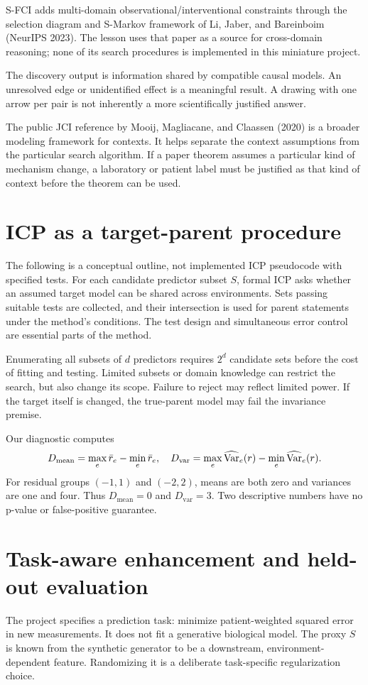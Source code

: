 \documentclass[11pt,oneside]{scrbook}
\begin{document}
S-FCI adds multi-domain observational/interventional constraints through the selection
diagram and S-Markov framework of Li, Jaber, and Bareinboim (NeurIPS 2023). The lesson
uses that paper as a source for cross-domain reasoning; none of its search procedures
is implemented in this miniature project.

\begin{keyidea}
The discovery output is information shared by compatible causal models. An unresolved
edge or unidentified effect is a meaningful result. A drawing with one arrow per pair
is not inherently a more scientifically justified answer.
\end{keyidea}

The public JCI reference by Mooij, Magliacane, and Claassen (2020) is a broader
modeling framework for contexts. It helps separate the context assumptions from
the particular search algorithm. If a paper theorem assumes a particular kind
of mechanism change, a laboratory or patient label must be justified as that kind
of context before the theorem can be used.

\section{ICP as a target-parent procedure}
The following is a conceptual outline, not implemented ICP pseudocode with specified
tests. For each candidate predictor subset $S$, formal ICP asks whether an assumed
target model can be shared across environments. Sets passing suitable tests are collected,
and their intersection is used for parent statements under the method's conditions.
The test design and simultaneous error control are essential parts of the method.

Enumerating all subsets of $d$ predictors requires $2^d$ candidate sets before the
cost of fitting and testing. Limited subsets or domain knowledge can restrict the
search, but also change its scope. Failure to reject may reflect limited power.
If the target itself is changed, the true-parent model may fail the invariance premise.

Our diagnostic computes
\[
D_{\mathrm{mean}}=\max_e\bar r_e-\min_e\bar r_e,
\quad
D_{\mathrm{var}}=\max_e\widehat{\operatorname{Var}}_e(r)-\min_e\widehat{\operatorname{Var}}_e(r).
\]
For residual groups $(-1,1)$ and $(-2,2)$, means are both zero and variances
are one and four. Thus $D_{\mathrm{mean}}=0$ and $D_{\mathrm{var}}=3$.
Two descriptive numbers have no p-value or false-positive guarantee.

\section{Task-aware enhancement and held-out evaluation}
The project specifies a prediction task: minimize patient-weighted squared error in
new measurements. It does not fit a generative biological model. The proxy $S$ is known
from the synthetic generator to be a downstream, environment-dependent feature.
Randomizing it is a deliberate task-specific regularization choice.
\end{document}

